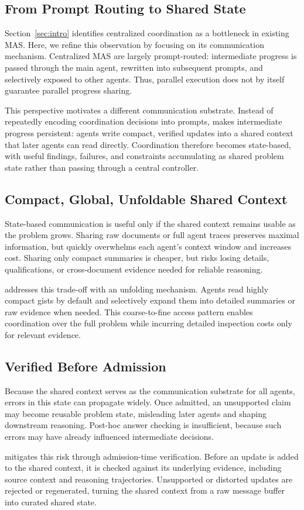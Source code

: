 \subsection{From Prompt Routing to Shared State}

Section~\ref{sec:intro} identifies centralized coordination as a bottleneck in existing MAS. Here, we refine this observation by focusing on its communication mechanism. Centralized MAS are largely {prompt-routed}: intermediate progress is passed through the main agent, rewritten into subsequent prompts, and selectively exposed to other agents. Thus, parallel execution does not by itself guarantee parallel progress sharing.

This perspective motivates a different communication substrate. Instead of repeatedly encoding coordination decisions into prompts, \toolName{} makes intermediate progress persistent: agents write compact, verified updates into a shared context that later agents can read directly. Coordination therefore becomes {state-based}, with useful findings, failures, and constraints accumulating as shared problem state rather than passing through a central controller.

\subsection{Compact, Global, Unfoldable Shared Context}

State-based communication is useful only if the shared context remains usable as the problem grows. Sharing raw documents or full agent traces preserves maximal information, but quickly overwhelms each agent's context window and increases cost. Sharing only compact summaries is cheaper, but risks losing details, qualifications, or cross-document evidence needed for reliable reasoning.

\toolName{} addresses this trade-off with an unfolding mechanism. Agents read highly compact gists by default and selectively expand them into detailed summaries or raw evidence when needed. This coarse-to-fine access pattern enables coordination over the full problem while incurring detailed inspection costs only for relevant evidence.


\subsection{Verified Before Admission}

Because the shared context serves as the communication substrate for all agents, errors in this state can propagate widely. Once admitted, an unsupported claim may become reusable problem state, misleading later agents and shaping downstream reasoning. Post-hoc answer checking is insufficient, because such errors may have already influenced intermediate decisions.

\toolName{} mitigates this risk through admission-time verification. Before an update is added to the shared context, it is checked against its underlying evidence, including source context and reasoning trajectories. Unsupported or distorted updates are rejected or regenerated, turning the shared context from a raw message buffer into curated shared state.

